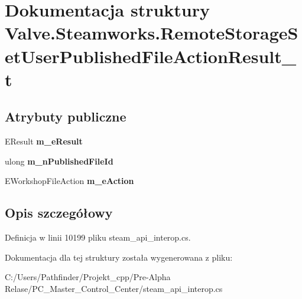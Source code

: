 \hypertarget{struct_valve_1_1_steamworks_1_1_remote_storage_set_user_published_file_action_result__t}{}\section{Dokumentacja struktury Valve.\+Steamworks.\+Remote\+Storage\+Set\+User\+Published\+File\+Action\+Result\+\_\+t}
\label{struct_valve_1_1_steamworks_1_1_remote_storage_set_user_published_file_action_result__t}
\subsection*{Atrybuty publiczne}
\begin{DoxyCompactItemize}
\item 
\mbox{\label{struct_valve_1_1_steamworks_1_1_remote_storage_set_user_published_file_action_result__t_ae3681e9c8e3564e8f81fc51d40fc83c9}} 
E\+Result {\bfseries m\+\_\+e\+Result}
\item 
\mbox{\label{struct_valve_1_1_steamworks_1_1_remote_storage_set_user_published_file_action_result__t_a4f52b3e162852769a17d2644a918188b}} 
ulong {\bfseries m\+\_\+n\+Published\+File\+Id}
\item 
\mbox{\label{struct_valve_1_1_steamworks_1_1_remote_storage_set_user_published_file_action_result__t_aaa0d45d221dcb1c6c882397af2ab0e73}} 
E\+Workshop\+File\+Action {\bfseries m\+\_\+e\+Action}
\end{DoxyCompactItemize}


\subsection{Opis szczegółowy}


Definicja w linii 10199 pliku steam\+\_\+api\+\_\+interop.\+cs.



Dokumentacja dla tej struktury została wygenerowana z pliku\+:\begin{DoxyCompactItemize}
\item 
C\+:/\+Users/\+Pathfinder/\+Projekt\+\_\+cpp/\+Pre-\/\+Alpha Relase/\+P\+C\+\_\+\+Master\+\_\+\+Control\+\_\+\+Center/steam\+\_\+api\+\_\+interop.\+cs\end{DoxyCompactItemize}
